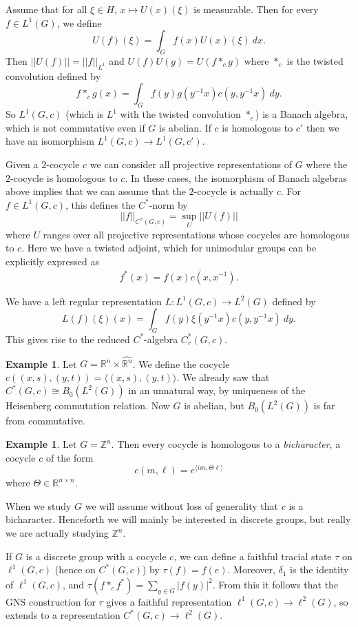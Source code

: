 \documentclass[12pt]{report}
\newcommand{\ZZ}{\mathbb{Z}}
\newcommand{\RR}{\mathbb{R}}
\newcommand{\dfn}[1]{\emph{#1}\index{#1}}
\theoremstyle{definition}
\newtheorem{example}[theorem]{Example}
\begin{document}
Assume that for all $\xi \in H$, $x \mapsto U(x)(\xi)$ is measurable. Then for every $f \in L^1(G)$, we define
$$U(f)(\xi) = \int_G f(x)U(x)(\xi) ~dx.$$
Then $||U(f)|| = ||f||_{L^1}$ and $U(f)U(g) = U(f*_cg)$ where $*_c$ is the twisted convolution defined by
$$f *_c g(x) = \int_G f(y) g(y^{-1}x)c(y, y^{-1}x) ~dy.$$
So $L^1(G, c)$ (which is $L^1$ with the twisted convolution $*_c$) is a Banach algebra, which is not commutative even if $G$ is abelian. If $c$ is homologous to $c'$ then we have an isomorphism $L^1(G, c) \to L^1(G, c')$. 

Given a $2$-cocycle $c$ we can consider all projective representations of $G$ where the $2$-cocycle is homologous to $c$. In these cases, the isomorphism of Banach algebras above implies that we can assume that the $2$-cocycle is actually $c$. For $f \in L^1(G, c)$, this defines the $C^*$-norm by
$$||f||_{C^*(G, c)} = \sup_U ||U(f)||$$
where $U$ ranges over all projective representations whose cocycles are homologous to $c$. Here we have a twisted adjoint, which for unimodular groups can be explicitly expressed as
$$f^*(x) = \overline{f(x) c(x, x^{-1})}.$$

We have a left regular representation $L: L^1(G, c) \to L^2(G)$ defined by
$$L(f)(\xi)(x) = \int_G f(y) \xi(y^{-1}x) c(y, y^{-1}x) ~dy.$$
This gives rise to the reduced $C^*$-algebra $C^*_r(G, c)$.

\begin{example}
    Let $G = \RR^n \times \widehat{\RR^n}$. We define the cocycle $c((x, s), (y, t)) = \langle (x, s), (y, t)\rangle$. We already saw that $C^*(G, c) \cong B_0(L^2(G))$ in an unnatural way, by uniqueness of the Heisenberg commutation relation. Now $G$ is abelian, but $B_0(L^2(G))$ is far from commutative.
\end{example}

\begin{example}
    Let $G = \ZZ^n$. Then every cocycle is homologous to a \dfn{bicharacter}, a cocycle $c$ of the form
    $$c(m, \ell) = e^{\langle im, \Theta \ell\rangle}$$
    where $\Theta \in \RR^{n \times n}$.

    When we study $G$ we will assume without loss of generality that $c$ is a bicharacter. Henceforth we will mainly be interested in discrete groups, but really we are actually studying $\ZZ^n$.
\end{example}
    If $G$ is a discrete group with a cocycle $c$, we can define a faithful tracial state $\tau$ on $\ell^1(G, c)$ (hence on $C^*(G, c)$) by $\tau(f) = f(e)$. Moreover, $\delta_1$ is the identity of $\ell^1(G, c)$, and $\tau(f *_c f^*) = \sum_{y \in G} |f(y)|^2$. From this it follows that the GNS construction for $\tau$ gives a faithful representation $\ell^1(G, c) \to \ell^2(G)$, so extends to a representation $C^*(G, c) \to \ell^2(G)$.
\end{document}
